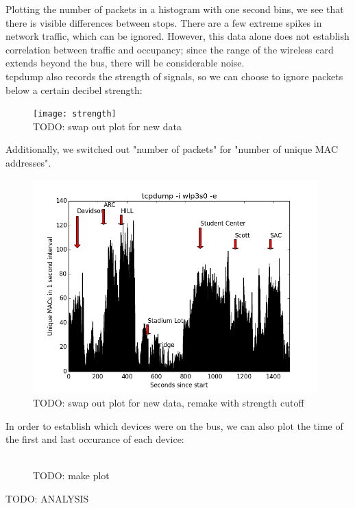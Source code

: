 \documentclass[letterpaper,english]{scrartcl}
\begin{document}
	Plotting the number of packets in a histogram with one second bins, we see that there is visible differences between stops.
	There are a few extreme spikes in network traffic, which can be ignored.
	However, this data alone does not establish correlation between traffic and occupancy; since the range of the wireless card extends beyond the bus, there will be considerable noise.
	\\
	tcpdump also records the strength of signals, so we can choose to ignore packets below a certain decibel strength:

	\begin{figure}[H]
	\texttt{[image: strength]}
	\\TODO: swap out plot for new data
	\centering
	\end{figure}

	Additionally, we switched out "number of packets" for "number of unique MAC addresses".

	\begin{figure}[H]
	\includegraphics[width=11cm]{unique}
	\\TODO: swap out plot for new data, remake with strength cutoff
	\centering
	\end{figure}

	In order to establish which devices were on the bus, we can also plot the time of the first and last occurance of each device:

	\begin{figure}[H]
	\\TODO: make plot
	\centering
	\end{figure}

	TODO: ANALYSIS
\end{document}
